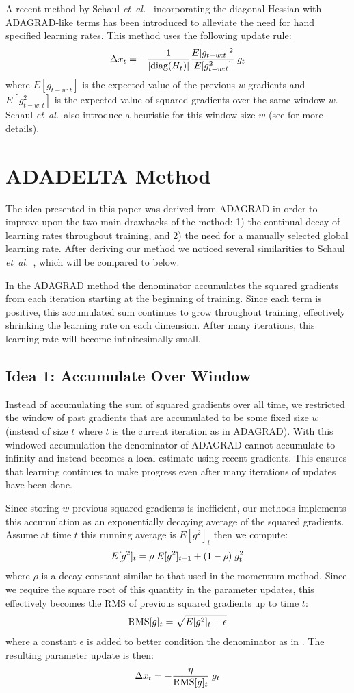\documentclass{article}
\def\BE{\vspace{-2.0mm}\begin{equation}}
\def\EE{\vspace{-1.4mm}\end{equation}}
\def\etal{{\textit{et~al.~}}}
\begin{document}
A recent method by Schaul \etal \cite{schaul2012} incorporating the diagonal Hessian with ADAGRAD-like terms has
been introduced to alleviate the need for hand specified learning rates. This method uses the
following update rule:
\BE
\Delta x_t = - \frac{1}{|\text{diag}(H_t)|} \frac{E[g_{t-w:t}]^2}{E[g_{t-w:t}^2]} \; g_t
\EE
where $E[g_{t-w:t}]$ is the expected value of the previous $w$ gradients and $E[g^2_{t-w:t}]$ is the
expected value of squared gradients over the same window $w$. Schaul \etal also introduce a
heuristic for this window size $w$ (see \cite{schaul2012} for more details).

\section{ADADELTA Method} \label{sec:method}
The idea presented in this paper was derived from ADAGRAD \cite{adagrad} in order to improve upon
the two main drawbacks of the method: 1) the continual decay of learning rates throughout training,
and 2) the need for a manually selected global learning rate. After
deriving our method we noticed several similarities to Schaul \etal \cite{schaul2012}, which will be
compared to below.

In the ADAGRAD method the denominator accumulates the squared gradients from each iteration starting
at the beginning of training. Since each term is positive, this accumulated sum continues to grow
throughout training, effectively shrinking the learning rate on each dimension. After many
iterations, this learning rate will become infinitesimally small.

\subsection{Idea 1: Accumulate Over Window}
Instead of accumulating the sum of squared gradients over all time, we restricted the window of
past gradients that are accumulated to be some fixed size $w$ (instead of size $t$ where $t$ is the
current iteration as in ADAGRAD). With this windowed accumulation the denominator of ADAGRAD cannot
accumulate to infinity and instead becomes a local estimate using recent gradients. This ensures
that learning continues to make progress even after many iterations of updates have been done.

Since storing $w$ previous squared gradients is inefficient, our methods implements this
accumulation as an exponentially decaying average of the squared gradients. Assume at time $t$ this
running average is $E[g^2]_t$ then we compute:
\BE
E[g^2]_t = \rho \; E[g^2]_{t-1} + (1-\rho) \; g_t^2
\EE
where $\rho$ is a decay constant similar to that used in the momentum method. Since we require the
square root of this quantity in the parameter updates, this effectively becomes the RMS of previous
squared gradients up to time $t$:
\BE
\text{RMS}[g]_t = \sqrt{E[g^2]_t + \epsilon}
\EE
where a constant $\epsilon$ is added to better condition the denominator as in \cite{becker1988}. The resulting parameter
update is then:
\BE
\Delta x_t = -  \frac{\eta}{\text{RMS}[g]_t} \; g_t
\label{eqn:idea1}
\EE
\end{document}
